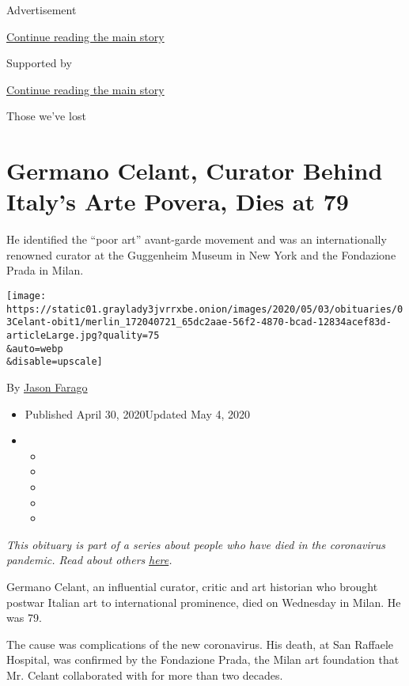 Advertisement

\protect\hyperlink{after-top}{Continue reading the main story}

Supported by

\protect\hyperlink{after-sponsor}{Continue reading the main story}

Those we've lost

\hypertarget{germano-celant-curator-behind-italys-arte-povera-dies-at-79}{%
\section{Germano Celant, Curator Behind Italy's Arte Povera, Dies at
79}\label{germano-celant-curator-behind-italys-arte-povera-dies-at-79}}

He identified the ``poor art'' avant-garde movement and was an
internationally renowned curator at the Guggenheim Museum in New York
and the Fondazione Prada in Milan.

\texttt{[image: https://static01.graylady3jvrrxbe.onion/images/2020/05/03/obituaries/03Celant-obit1/merlin\_172040721\_65dc2aae-56f2-4870-bcad-12834acef83d-articleLarge.jpg?quality=75\\\&auto=webp\\\&disable=upscale]}

By \href{https://www.nytimes3xbfgragh.onion/by/jason-farago}{Jason
Farago}

\begin{itemize}
\item
  Published April 30, 2020Updated May 4, 2020
\item
  \begin{itemize}
  \item
  \item
  \item
  \item
  \item
  \end{itemize}
\end{itemize}

\emph{This obituary is part of a series about people who have died in
the coronavirus pandemic. Read about others}
\href{https://www.nytimes3xbfgragh.onion/series/people-who-have-died-of-the-coronavirus}{\emph{here}}\emph{.}

Germano Celant, an influential curator, critic and art historian who
brought postwar Italian art to international prominence, died on
Wednesday in Milan. He was 79.

The cause was complications of the new coronavirus. His death, at San
Raffaele Hospital, was confirmed by the Fondazione Prada, the Milan art
foundation that Mr. Celant collaborated with for more than two decades.

